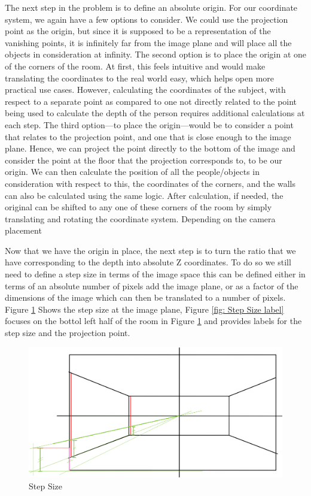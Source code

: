 \documentclass[12pt]{report}
\begin{document}
The next step in the problem is to define an absolute origin. For our coordinate system, we again have a few options to consider. We could use the projection point as the origin, but since it is supposed to be a representation of the vanishing points, it is infinitely far from the image plane and will place all the objects in consideration at infinity. The second option is to place the origin at one of the corners of the room. At first, this feels intuitive and would make translating the coordinates to the real world easy, which helps open more practical use cases. However, calculating the coordinates of the subject, with respect to a separate point as compared to one not directly related to the point being used to calculate the depth of the person requires additional calculations at each step. The third option—to place the origin—would be to consider a point that relates to the projection point, and one that is close enough to the image plane. Hence, we can project the point directly to the bottom of the image and consider the point at the floor that the projection corresponds to, to be our origin. We can then calculate the position of all the people/objects in consideration with respect to this, the coordinates of the corners, and the walls can also be calculated using the same logic. After calculation, if needed, the original can be shifted to any one of these corners of the room by simply translating and rotating the coordinate system. Depending on the camera placement\newline

Now that we have the origin in place, the next step is to turn the ratio that we have corresponding to the depth into absolute Z coordinates. To do so we still need to define a step size in terms of the image space this can be defined either in terms of an absolute number of pixels add the image plane, or as a factor of the dimensions of the image which can then be translated to a number of pixels. Figure \ref{fig:Step Size} Shows the step size at the image plane, Figure \ref{fig: Step Size label} focuses on the bottol left half of the room in Figure \ref{fig:Step Size} and provides labels for the step size and the projection point.\newline

\begin{figure}[H]
    \centering
    \includegraphics[width=1.0\textwidth]{Calculations5.jpeg}
    \caption{Step Size}
    \label{fig:Step Size}
\end{figure}
\end{document}
